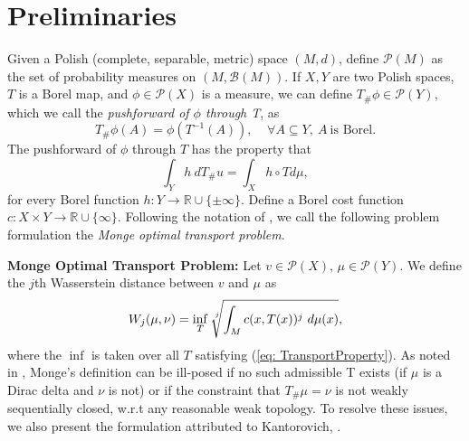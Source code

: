 \documentclass[10pt]{article}
\begin{document}
\section{Preliminaries}
\label{sec: Preliminaries}
Given a Polish (complete, separable, metric) space $(M,d)$, define $\mathcal{P}(M)$ as the set of probability measures on $(M, \mathcal{B}(M))$. If $X, Y$ are two Polish spaces, $T$ is a Borel map, and $\phi \in \mathcal{P}(X)$ is a measure, we can define $T_{\#}\phi \in \mathcal{P}(Y)$, which we call the \textit{pushforward of $\phi$ through T}, as 
\begin{equation}
T_{\#}\phi(A) = \phi(T^{-1}(A)), \ \ \ \ \ \forall A \subseteq Y, \  A \  \text{is Borel}.
\label{eq: TransportDefn}
\end{equation}
The pushforward of $\phi$ through $T$ has the property that
\begin{equation}
\int_Y h \ dT_{\#}u = \int_X h \circ T d\mu,
\label{eq: TransportProperty}
\end{equation}
for every Borel function $h: Y \rightarrow \mathbb{R} \cup \{\pm \infty\}$. Define a Borel cost function $c: X \times Y \rightarrow \mathbb{R} \cup \{\infty\}$. Following the notation of \cite{AN}, we call the following problem formulation the \textit{Monge optimal transport problem}.

\noindent \textbf{Monge Optimal Transport Problem:} Let $v \in \mathcal{P}(X)$, $\mu \in \mathcal{P}(Y).$ We define the $j$th Wasserstein distance between $v$ and $\mu$ as
\begin{equation}
W_j(\mu,\nu) = \inf_{T} \sqrt[\leftroot{-2}\uproot{2}j]{\int_{M}c(x, T(x))^{j} \ d\mu(x)},
\label{eq: CostWassDist}
\end{equation}
where the $\inf$ is taken over all $T$ satisfying (\ref{eq: TransportProperty}). As noted in \cite{AN}, Monge's definition can be ill-posed if no such admissible T exists (if $\mu$ is a Dirac delta and $\nu$ is not) or if the constraint that $T_{\#}\mu = \nu$ is not weakly sequentially closed, w.r.t any reasonable weak topology. To resolve these issues, we also present the formulation attributed to Kantorovich, \cite{AN}.
\end{document}
